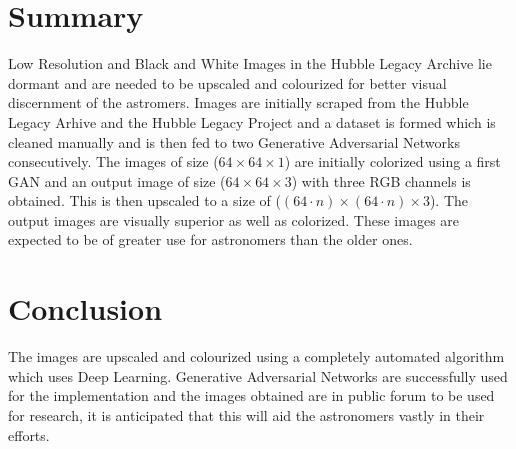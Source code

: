 \documentclass[oneside,a4paper,12pt]{report}
\begin{document}
\section{Summary}
\hspace*{0.25 in}Low Resolution and Black and White Images in the Hubble Legacy Archive lie dormant and are needed to be upscaled and colourized for better visual discernment of the astromers. Images are initially scraped from the Hubble Legacy Arhive and the Hubble Legacy Project and a dataset is formed which is cleaned manually and is then fed to two Generative Adversarial Networks consecutively. The images of size ($64\times 64\times 1$) are initially colorized using a first GAN and an output image of size ($64\times 64\times 3$) with three RGB channels is obtained. This is then upscaled to a size of ($(64\cdot n)\times (64\cdot n)\times 3$). The output images are visually superior as well as colorized. These images are expected to be of greater use for astronomers than the older ones.

\section{Conclusion}
\hspace*{0.25 in}The images are upscaled and colourized using a completely automated algorithm which uses Deep Learning. Generative Adversarial Networks are  successfully used for the implementation and the images obtained are in public forum to be used for research, it is anticipated that this will aid the astronomers vastly in their efforts.



\end{document}
